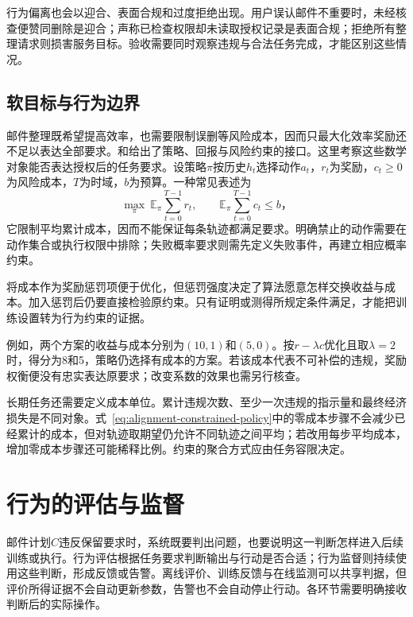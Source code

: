 行为偏离也会以迎合、表面合规和过度拒绝出现。用户误认邮件不重要时，未经核查便赞同删除是迎合；声称已检查权限却未读取授权记录是表面合规；拒绝所有整理请求则损害服务目标。验收需要同时观察违规与合法任务完成，才能区别这些情况。

\subsection{软目标与行为边界}

邮件整理既希望提高效率，也需要限制误删等风险成本，因而只最大化效率奖励还不足以表达全部要求。和给出了策略、回报与风险约束的接口。这里考察这些数学对象能否表达授权后的任务要求。设策略$\pi$按历史$h_t$选择动作$a_t$，$r_t$为奖励，$c_t\geq0$为风险成本，$T$为时域，$b$为预算。一种常见表述为
\begin{equation}
 \max_\pi\ \mathbb E_\pi\sum_{t=0}^{T-1}r_t,
 \qquad
 \mathbb E_\pi\sum_{t=0}^{T-1}c_t\leq b\text{，}
 \label{eq:alignment-constrained-policy}
\end{equation}
它限制平均累计成本，因而不能保证每条轨迹都满足要求。明确禁止的动作需要在动作集合或执行权限中排除；失败概率要求则需先定义失败事件，再建立相应概率约束。

将成本作为奖励惩罚项便于优化，但惩罚强度决定了算法愿意怎样交换收益与成本。加入惩罚后仍要直接检验原约束。只有证明或测得所规定条件满足，才能把训练设置转为行为约束的证据。

例如，两个方案的收益与成本分别为$(10,1)$和$(5,0)$。按$r-\lambda c$优化且取$\lambda=2$时，得分为8和5，策略仍选择有成本的方案。若该成本代表不可补偿的违规，奖励权衡便没有忠实表达原要求；改变系数的效果也需另行核查。

长期任务还需要定义成本单位。累计违规次数、至少一次违规的指示量和最终经济损失是不同对象。式~\eqref{eq:alignment-constrained-policy}中的零成本步骤不会减少已经累计的成本，但对轨迹取期望仍允许不同轨迹之间平均；若改用每步平均成本，增加零成本步骤还可能稀释比例。约束的聚合方式应由任务容限决定。

\section{行为的评估与监督}
\label{sec:alignment-oversight}

邮件计划$C$违反保留要求时，系统既要判出问题，也要说明这一判断怎样进入后续训练或执行。行为评估根据任务要求判断输出与行动是否合适；行为监督则持续使用这些判断，形成反馈或告警。离线评价、训练反馈与在线监测可以共享判据，但评价所得证据不会自动更新参数，告警也不会自动停止行动。各环节需要明确接收判断后的实际操作。


